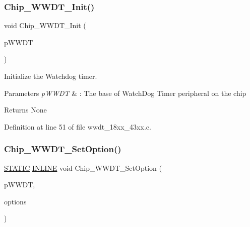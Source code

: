 \subsubsection{\texorpdfstring{Chip\+\_\+\+W\+W\+D\+T\+\_\+\+Init()}{Chip\_WWDT\_Init()}}
{\footnotesize\ttfamily void Chip\+\_\+\+W\+W\+D\+T\+\_\+\+Init (\begin{DoxyParamCaption}\item[{\hyperlink{struct_l_p_c___w_w_d_t___t}{L\+P\+C\+\_\+\+W\+W\+D\+T\+\_\+T} $\ast$}]{p\+W\+W\+DT }\end{DoxyParamCaption})}



Initialize the Watchdog timer. 


\begin{DoxyParams}{Parameters}
{\em p\+W\+W\+DT} & \+: The base of Watch\+Dog Timer peripheral on the chip \\
\hline
\end{DoxyParams}
\begin{DoxyReturn}{Returns}
None 
\end{DoxyReturn}


Definition at line 51 of file wwdt\+\_\+18xx\+\_\+43xx.\+c.

\mbox{\label{group___w_w_d_t__18_x_x__43_x_x_gab1908a91ca65434f14402e4a8373091f}} 
\subsubsection{\texorpdfstring{Chip\+\_\+\+W\+W\+D\+T\+\_\+\+Set\+Option()}{Chip\_WWDT\_SetOption()}}
{\footnotesize\ttfamily \hyperlink{group___l_p_c___types___public___macros_ga10b2d890d871e1489bb02b7e70d9bdfb}{S\+T\+A\+T\+IC} \hyperlink{spifi__18xx__43xx_8h_a2eb6f9e0395b47b8d5e3eeae4fe0c116}{I\+N\+L\+I\+NE} void Chip\+\_\+\+W\+W\+D\+T\+\_\+\+Set\+Option (\begin{DoxyParamCaption}\item[{\hyperlink{struct_l_p_c___w_w_d_t___t}{L\+P\+C\+\_\+\+W\+W\+D\+T\+\_\+T} $\ast$}]{p\+W\+W\+DT,  }\item[{uint32\+\_\+t}]{options }\end{DoxyParamCaption})}



